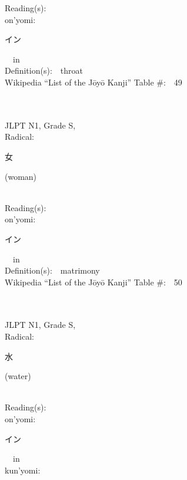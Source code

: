 \begin{multicols}{2}
Reading(s):\ \ \\
{\hspace*{1em}}on'yomi:\ \ \\
{\hspace*{2em}}{\begin{CJK}{UTF8}{min} イン \end{CJK}}\ \ in\ \ \\
Definition(s):\ \ throat \\
Wikipedia ``List of the J\=oy\=o Kanji'' Table \#:\ \ 49 \\
\ \ \\
{\fontsize{34pt}{40pt}  }\ \ \\
{JLPT N1, Grade S, \\Radical:\ \ {\begin{CJK}{UTF8}{min} 女 \end{CJK}} (woman) } \\
Reading(s):\ \ \\
{\hspace*{1em}}on'yomi:\ \ \\
{\hspace*{2em}}{\begin{CJK}{UTF8}{min} イン \end{CJK}}\ \ in\ \ \\
Definition(s):\ \ matrimony \\
Wikipedia ``List of the J\=oy\=o Kanji'' Table \#:\ \ 50 \\
\ \ \\
{\fontsize{34pt}{40pt}  }\ \ \\
{JLPT N1, Grade S, \\Radical:\ \ {\begin{CJK}{UTF8}{min} 水 \end{CJK}} (water) } \\
Reading(s):\ \ \\
{\hspace*{1em}}on'yomi:\ \ \\
{\hspace*{2em}}{\begin{CJK}{UTF8}{min} イン \end{CJK}}\ \ in\ \ \\
{\hspace*{1em}}kun'yomi:\ \ \\

\end{multicols}
